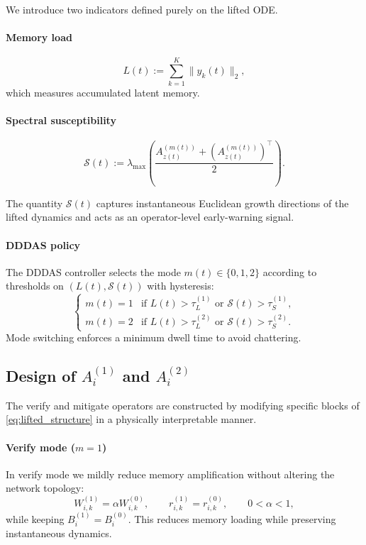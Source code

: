 \documentclass[12pt,a4paper]{article}
\theoremstyle{definition}
\theoremstyle{remark}
\begin{document}
We introduce two indicators defined purely on the lifted ODE.

\paragraph{Memory load}
\begin{equation}
	\label{eq:L_def}
	L(t) := \sum_{k=1}^K \|y_k(t)\|_2 ,
\end{equation}
which measures accumulated latent memory.

\paragraph{Spectral susceptibility}
\begin{equation}
	\label{eq:S_def}
	\mathcal S(t)
	:=
	\lambda_{\max}\!\left(
	\frac{A_{z(t)}^{(m(t))} + (A_{z(t)}^{(m(t))})^\top}{2}
	\right).
\end{equation}

The quantity $\mathcal S(t)$ captures instantaneous Euclidean growth directions
of the lifted dynamics and acts as an operator-level early-warning signal.

\paragraph{DDDAS policy}

The DDDAS controller selects the mode $m(t)\in\{0,1,2\}$ according to thresholds
on $(L(t),\mathcal S(t))$ with hysteresis:
\[
\begin{cases}
	m(t)=1 & \text{if } L(t)>\tau_L^{(1)} \text{ or } \mathcal S(t)>\tau_S^{(1)},\\
	m(t)=2 & \text{if } L(t)>\tau_L^{(2)} \text{ or } \mathcal S(t)>\tau_S^{(2)}.
\end{cases}
\]
Mode switching enforces a minimum dwell time to avoid chattering.
\subsection{Design of $A_i^{(1)}$ and $A_i^{(2)}$}
\label{subsec:design_A}

The verify and mitigate operators are constructed by modifying specific blocks
of \eqref{eq:lifted_structure} in a physically interpretable manner.

\paragraph{Verify mode ($m=1$)}
In verify mode we mildly reduce memory amplification without altering the
network topology:
\[
W_{i,k}^{(1)} = \alpha W_{i,k}^{(0)}, \qquad
r_{i,k}^{(1)} = r_{i,k}^{(0)}, \qquad 0<\alpha<1,
\]
while keeping $B_i^{(1)}=B_i^{(0)}$.
This reduces memory loading while preserving instantaneous dynamics.
\end{document}
